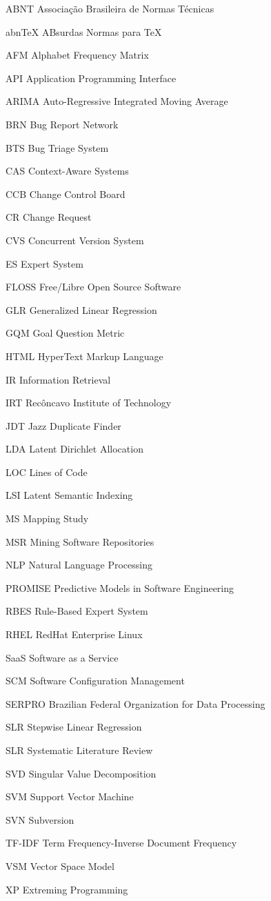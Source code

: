 
\begin{siglas}
	\item[ABNT]{Associação Brasileira de Normas Técnicas}
	\item[abnTeX]{ABsurdas Normas para TeX}
  	\item[AFM]{Alphabet Frequency Matrix}
	\item[API]{Application Programming Interface}
	\item[ARIMA]{Auto-Regressive Integrated Moving Average}
	\item[BRN]{Bug Report Network}
	\item[BTS]{Bug Triage System}
	\item[CAS]{Context-Aware Systems}
	\item[CCB]{Change Control Board}
	\item[CR]{Change Request}
	\item[CVS]{Concurrent Version System}
	\item[ES]{Expert System}
	\item[FLOSS]{Free/Libre Open Source Software}
	\item[GLR]{Generalized Linear Regression}
	\item[GQM]{Goal Question Metric}
	\item[HTML]{HyperText Markup Language}
	\item[IR]{Information Retrieval}
	\item[IRT]{Recôncavo Institute of Technology}
	\item[JDT]{Jazz Duplicate Finder}
	\item[LDA]{Latent Dirichlet Allocation}
	\item[LOC]{Lines of Code}
	\item[LSI]{Latent Semantic Indexing}
	\item[MS]{Mapping Study}
	\item[MSR]{Mining Software Repositories}
	\item[NLP]{Natural Language Processing}
	\item[PROMISE]{Predictive Models in Software Engineering}
	\item[RBES]{Rule-Based Expert System}
	\item[RHEL]{RedHat Enterprise Linux}
	\item[SaaS]{Software as a Service}
	\item[SCM]{Software Configuration Management}
	\item[SERPRO]{Brazilian Federal Organization for Data Processing}
	\item[SLR]{Stepwise Linear Regression}
	\item[SLR]{Systematic Literature Review}
	\item[SVD]{Singular Value Decomposition}
	\item[SVM]{Support Vector Machine}
	\item[SVN]{Subversion}
	\item[TF-IDF]{Term Frequency-Inverse Document Frequency}
	\item[VSM]{Vector Space Model}
	\item[XP]{Extreming Programming}
\end{siglas}
